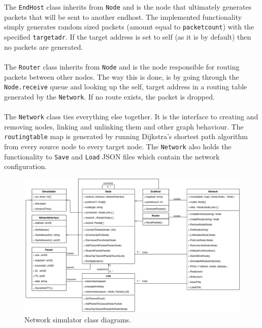 \\\\
The \texttt{EndHost} class inherits from \texttt{Node} and is the node that ultimately generates packets that will be sent to another endhost. The implemented functionality simply generates random sized packets (amount equal to \texttt{packetcount}) with the specified \texttt{targetadr}. If the target address is set to self (as it is by default) then no packets are generated. 
\\\\
The \texttt{Router} class inherits from \texttt{Node} and is the node responsible for routing packets between other nodes. The way this is done, is by going through the \texttt{Node.receive} queue and looking up the self, target address in a routing table generated by the \texttt{Network}. If no route exists, the packet is dropped.
\\\\
The \texttt{Network} class ties everything else together. It is the interface to creating and removing nodes, linking and unlinking them and other graph behaviour. The \texttt{routingtable} map is generated by running Dijkstra's shortest path algorithm from every source node to every target node. The \texttt{Network} also holds the functionality to \texttt{Save} and \texttt{Load} JSON files which contain the network configuration.

\begin{figure}[!htbp]
\begin{center}
	\includegraphics[width=13cm]{classdiagrams.png}
    \caption{Network simulator class diagrams.}
	\label{img:classdiagram}			%
\end{center}
\end{figure}

